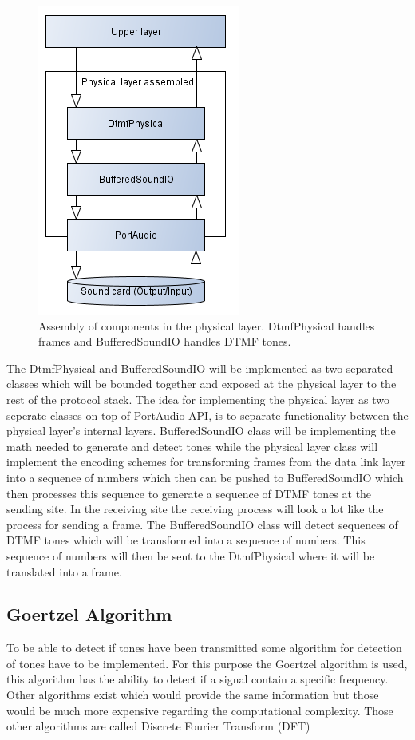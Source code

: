 	\begin{figure}[htb]
		\begin{center}
		\includegraphics[scale=0.6,trim=0 0 0 0]{content/graphics/physical/physical_4layers.png}%
		\caption{Assembly of components in the physical layer. DtmfPhysical handles frames and BufferedSoundIO handles DTMF tones.}
		\label{fig:physical_4layers}
		\end{center}
	\end{figure}
	
	The DtmfPhysical and BufferedSoundIO will be implemented as two separated classes which will be bounded together
	and exposed at the physical layer to the rest of the protocol stack. The idea for implementing the physical layer
	as two seperate classes on top of PortAudio API, is to separate functionality between the physical layer's internal
	layers. BufferedSoundIO class will be implementing the math needed to generate and detect tones while the physical
	layer class will implement the encoding schemes for transforming frames from the data link layer into a sequence of
	numbers which then can be pushed to BufferedSoundIO which then processes this sequence to generate a sequence of DTMF
	tones at the sending site. In the receiving site the receiving process will look a lot like the process for sending a
	frame. The BufferedSoundIO class will detect sequences of DTMF tones which will be transformed into a sequence of
	numbers. This sequence of numbers will then be sent to the DtmfPhysical where it will be translated into a frame.
	
	\subsection{Goertzel Algorithm}
	To be able to detect if tones have been transmitted some algorithm for detection of tones have to be implemented.
	For this purpose the Goertzel algorithm is used, this algorithm has the ability to detect if a signal contain a
	specific frequency. Other algorithms exist which would provide the same information but those would be
	much more expensive regarding the computational complexity. Those other algorithms are called Discrete Fourier Transform (DFT)
	
